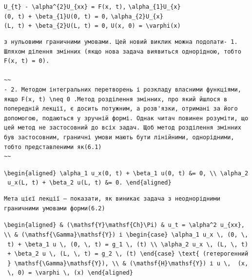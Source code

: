 \documentclass[
  ukrainian,
]{article}
\begin{document}
\texttt{U\_\{t\}\ -\ \textbackslash{}alpha\^{}\{2\}U\_\{xx\}\ =\ F(x,\ t),}
\texttt{\textbackslash{}alpha\_\{1\}U\_\{x\}(0,\ t)\ +\ \textbackslash{}beta\_\{1\}U(0,\ t)\ =\ 0,}
\texttt{\textbackslash{}alpha\_\{2\}U\_\{x\}(L,\ t)\ +\ \textbackslash{}beta\_\{2\}U(L,\ t)\ =\ 0,}
\texttt{U(x,\ 0)\ =\ \textbackslash{}varphi(x)}

\begin{verbatim}
з нульовими граничними умовами. Цей новий виклик можна подолати- 1. Шляхом ділення змінних (якщо нова задача виявиться однорідною, тобто F(x, t) = 0).

~~
- 2. Методом інтегральних перетворень і розкладу власними функціями, якщо F(x, t) \neq 0 .Метод розділення змінних, про який йшлося в попередній лекції, є досить потужним, а розв'язки, отримані за його допомогою, подаються у зручній формі. Однак читач повинен розуміти, що цей метод не застосовний до всіх задач. Щоб метод розділення змінних був застосовним, граничні умови мають бути лінійними, однорідними, тобто представленими як(6.1)
~~
\end{verbatim}

\texttt{\textbackslash{}begin\{aligned\}\ \textbackslash{}alpha\_1\ u\_x(0,\ t)\ +\ \textbackslash{}beta\_1\ u(0,\ t)\ \&=\ 0,\ \textbackslash{}\textbackslash{}\ \textbackslash{}alpha\_2\ u\_x(L,\ t)\ +\ \textbackslash{}beta\_2\ u(L,\ t)\ \&=\ 0.\ \textbackslash{}end\{aligned\}}

\begin{verbatim}
Мета цієї лекції — показати, як виникає задача з неоднорідними граничними умовами форми(6.2)
\end{verbatim}

\texttt{\textbackslash{}begin\{aligned\}\ \&\ (\textbackslash{}mathsf\{Y\}\textbackslash{}mathsf\{Ch\}\textbackslash{}Pi)\ \&\ u\_t\ =\ \textbackslash{}alpha\^{}2\ u\_\{xx\},\ \textbackslash{}\textbackslash{}\ \&\ (\textbackslash{}mathsf\{\textbackslash{}Gamma\}\textbackslash{}mathsf\{Y\})\ і\ \textbackslash{}begin\{case\}\ \textbackslash{}alpha\_1\ u\_x\ \textbackslash{},\ (0,\ \textbackslash{},\ t)\ +\ \textbackslash{}beta\_1\ u\ \textbackslash{},\ (0,\ \textbackslash{},\ t)\ =\ g\_1\ \textbackslash{},\ (t)\ \textbackslash{}\textbackslash{}\ \textbackslash{}alpha\_2\ u\_x\ \textbackslash{},\ (L,\ \textbackslash{},\ t)\ +\ \textbackslash{}beta\_2\ u\ \textbackslash{},\ (L,\ \textbackslash{},\ t)\ =\ g\_2\ \textbackslash{},\ (t)\ \textbackslash{}end\{case\}\ \textbackslash{}text\{\ (гетерогенний\ \}\ \textbackslash{}mathsf\{\textbackslash{}Gamma\}\textbackslash{}mathsf\{Y\}),\ \textbackslash{}\textbackslash{}\ \&\ (\textbackslash{}mathsf\{H\}\textbackslash{}mathsf\{Y\})\ і\ u\ \textbackslash{},\ \ (x,\ \textbackslash{},\ 0)\ =\ \textbackslash{}varphi\ \textbackslash{},\ (x)\ \textbackslash{}end\{aligned\}}
\end{document}
